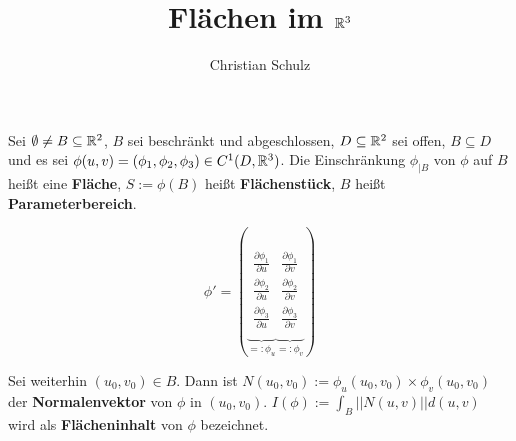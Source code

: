 \documentclass{article}
\title{Flächen im $\mathbb{R}^3$}
\author{Christian Schulz}
\begin{document}
\maketitle

\begin{definition}
Sei $\emptyset \ne B \subseteq \mathbb{R}^2$, $B$ sei beschränkt und abgeschlossen,
$D \subseteq \mathbb{R}^2$ sei offen, $B \subseteq D$ und es sei $\phi(u,v) = (\phi_{1}, \phi_{2}, \phi_{3}) \in C^{1}(D,\mathbb{R}^3)$.
Die Einschränkung $\phi_{|B}$ von $\phi$ auf $B$ heißt eine \textbf{Fläche}, $S := \phi(B)$ heißt \textbf{Flächenstück}, $B$ heißt 
\textbf{Parameterbereich}.

$$\phi' = 
\left(
\underbrace{
\begin{array}{ccc}
\frac{\partial \phi_1}{\partial u} \\
\frac{\partial \phi_2}{\partial u} \\ 
\frac{\partial \phi_3}{\partial u} \\
\end{array}
}_{=:\phi_u}
\underbrace{
\begin{array}{ccc}
\frac{\partial \phi_1}{\partial v} \\
\frac{\partial \phi_2}{\partial v} \\ 
\frac{\partial \phi_3}{\partial v} \\
\end{array}
}_{=:\phi_v}
\right)$$

Sei weiterhin $(u_0, v_0) \in B$. Dann ist $N(u_0,v_0) := \phi_u(u_0,v_0) \times \phi_v(u_0,v_0)$ der \textbf{Normalenvektor} 
von $\phi$ in $(u_0,v_0)$. $I(\phi) := \int_B ||N(u,v)|| d(u,v)$ wird als \textbf{Flächeninhalt} von $\phi$ bezeichnet.
\end{definition}
\end{document}
